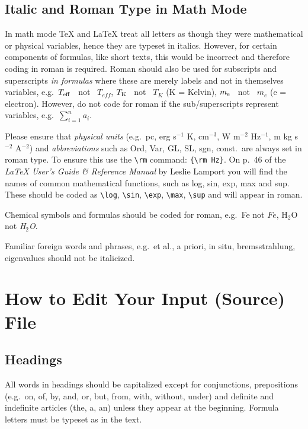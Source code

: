 \subsection{Italic and Roman Type in Math Mode}
%
\begin{alpherate}
\item
In math mode \TeX{} and \LaTeX{} treat all letters as though they
were mathematical or physical variables, hence they are typeset in
italics. However, for certain components of formulas, like short texts,
this would be incorrect and therefore coding in  roman is required.
Roman should also be used for
subscripts and superscripts {\it in formulas\/} where these are
merely labels and not in themselves variables,
e.g.\ $T_{\rm eff}$ \ not \ $T_{eff}$,
$T_{\rm K}$ \ not \ $T_K$ (K = Kelvin),
$m_{\rm e}$ \ not \ $m_e$ (e = electron).
However, do not code for roman
if the sub/superscripts represent variables,
e.g.\ $\sum_{i=1}^{n} a_{i}$.
\item
Please ensure that {\em physical units\/} (e.g.\ pc, erg s$^{-1}$
K, cm$^{-3}$, W m$^{-2}$ Hz$^{-1}$, m kg s$^{-2}$ A$^{-2}$) and
{\it abbreviations} such as Ord, Var, GL, SL, sgn, const.\
are always set in roman type. To ensure
this use the \verb|\rm| command: \verb|{\rm Hz}|.
On p.\ 46 of the {\em \LaTeX{} User's Guide \& Reference
Manual\/} by Leslie Lamport you will find the names of
common mathe\-matical functions, such as log, sin, exp, max and sup.
These should be coded as \verb|\log|,
\verb|\sin|, \verb|\exp|, \verb|\max|, \verb|\sup|
and will appear in roman.
\item
Chemical symbols and formulas should be coded for roman,
e.g.\ Fe not $Fe$, H$_2$O not {\em H$_2$O\/}.
\item
Familiar foreign words and phrases, e.g.\ et al.,
a priori, in situ, brems\-strah\-lung, eigenvalues should not be
italicized.
\end{alpherate}
%
\section{How to Edit Your Input (Source) File}
\label{refedit}
%
\subsection{Headings}
%
All words in  headings should be capitalized except for
conjunctions,  prepositions
(e.g.\ on, of, by, and, or, but,  from, with, without, under)
and definite and indefinite articles (the, a, an) unless they appear at
the beginning. Formula letters must be typeset as in the text.
%
